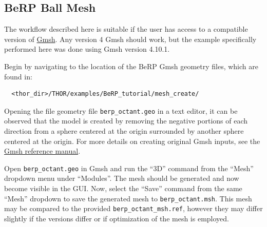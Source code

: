 \subsection{BeRP Ball Mesh}\label{ch:tuts:sec:berp:ssec:mesh}

The workflow described here is suitable if the user has access to a compatible version of \href{https://gmsh.info/}{Gmsh}.
Any version 4 Gmsh should work, but the example specifically performed here was done using Gmsh version 4.10.1.

Begin by navigating to the location of the BeRP Gmsh geometry files, which are found in:
\begin{verbatim}
  <thor_dir>/THOR/examples/BeRP_tutorial/mesh_create/
\end{verbatim}
Opening the file geometry file \verb"berp_octant.geo" in a text editor, it can be observed that the model is created by removing the negative portions of each direction from a sphere centered at the origin surrounded by another sphere centered at the origin.
For more details on creating original Gmsh inputs, see the \href{https://gmsh.info/doc/texinfo/gmsh.html}{Gmsh reference manual}.

Open \verb"berp_octant.geo" in Gmsh and run the ``3D'' command from the ``Mesh'' dropdown menu under ``Modules''.
The mesh should be generated and now become visible in the \ac{GUI}.
Now, select the ``Save'' command from the same ``Mesh'' dropdown to save the generated mesh to \verb"berp_octant.msh".
This mesh may be compared to the provided \verb"berp_octant_msh.ref", however they may differ slightly if the versions differ or if optimization of the mesh is employed.

